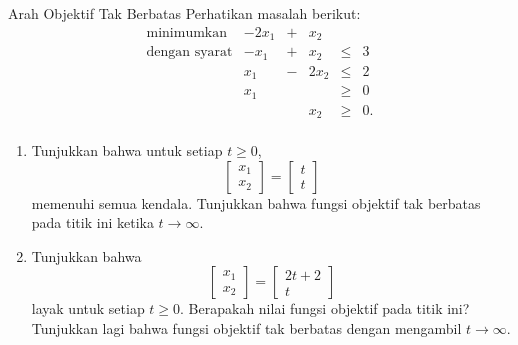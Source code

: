 
\begin{ex}{Arah Objektif Tak Berbatas}{}
Perhatikan masalah berikut:
\[
\begin{array}{rrcrll}
\text{minimumkan } & -2x_1 & + & x_2 & \\
\text{dengan syarat} & -x_1 & + & x_2 & \leq & 3 \\
& x_1 & - & 2x_2 & \leq & 2 \\
& x_1 & & & \geq & 0 \\
& & & x_2 & \geq & 0. \\
\end{array}
\]

\begin{enumerate}
\item Tunjukkan bahwa untuk setiap \(t \geq 0\),
\[
\begin{bmatrix} x_1 \\ x_2 \end{bmatrix} = \begin{bmatrix} t \\ t \end{bmatrix}
\]
memenuhi semua kendala. Tunjukkan bahwa fungsi objektif tak berbatas pada titik ini ketika $t \to \infty$.

\item Tunjukkan bahwa \[
\begin{bmatrix} x_1 \\ x_2 \end{bmatrix} = \begin{bmatrix} 2t+2 \\ t \end{bmatrix}
\]
 layak untuk setiap \(t \geq 0\). Berapakah nilai fungsi objektif pada titik ini? Tunjukkan lagi bahwa fungsi objektif tak berbatas dengan mengambil $t \to \infty$.
 \end{enumerate}
 \end{ex}

